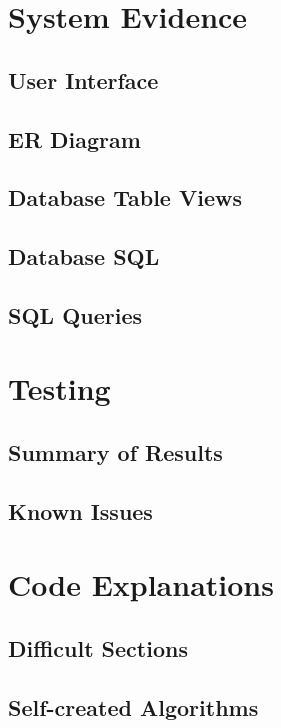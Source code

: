\section{System Evidence}

\subsection{User Interface}

\subsection{ER Diagram}

\subsection{Database Table Views}

\subsection{Database SQL}

\subsection{SQL Queries}

\section{Testing}

\subsection{Summary of Results}

\subsection{Known Issues}

\section{Code Explanations}

\subsection{Difficult Sections}

\subsection{Self-created Algorithms}

